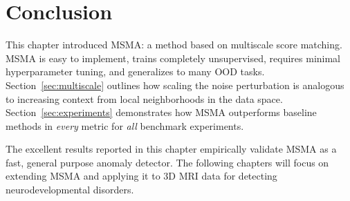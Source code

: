 
\section{Conclusion}

This chapter introduced MSMA: a method based on multiscale score matching. MSMA is easy to implement, trains completely unsupervised, requires minimal hyperparameter tuning, and generalizes to many OOD tasks. Section~\ref{sec:multiscale} outlines how scaling the noise perturbation is analogous to increasing context from local neighborhoods in the data space.
Section~\ref{sec:experiments} demonstrates how MSMA outperforms baseline methods in \textit{every} metric for \textit{all} benchmark experiments. 

The excellent results reported in this chapter empirically validate MSMA as a fast, general purpose anomaly detector. The following chapters will focus on extending MSMA and applying it to 3D MRI data for detecting neurodevelopmental disorders.